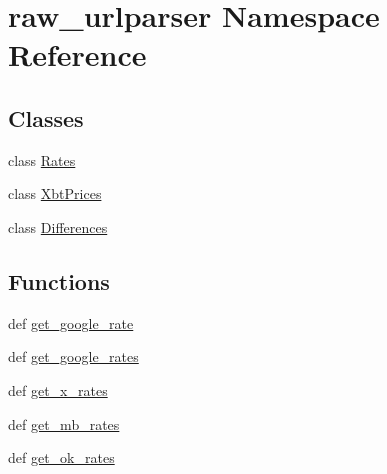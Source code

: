 \hypertarget{namespaceraw__urlparser}{\section{raw\-\_\-urlparser Namespace Reference}
\label{namespaceraw__urlparser}
}
\subsection*{Classes}
\begin{DoxyCompactItemize}
\item 
class \hyperlink{classraw__urlparser_1_1_rates}{Rates}
\item 
class \hyperlink{classraw__urlparser_1_1_xbt_prices}{Xbt\-Prices}
\item 
class \hyperlink{classraw__urlparser_1_1_differences}{Differences}
\end{DoxyCompactItemize}
\subsection*{Functions}
\begin{DoxyCompactItemize}
\item 
def \hyperlink{namespaceraw__urlparser_a27ce239a7915c6468e00168213575365}{get\-\_\-google\-\_\-rate}
\item 
def \hyperlink{namespaceraw__urlparser_a503f638b00ab579b8b829e1dbb95e547}{get\-\_\-google\-\_\-rates}
\item 
def \hyperlink{namespaceraw__urlparser_a264ca664879b007ee92399e30ec0d9bc}{get\-\_\-x\-\_\-rates}
\item 
def \hyperlink{namespaceraw__urlparser_a56532368ca9848b5f2ab298e3e6232bb}{get\-\_\-mb\-\_\-rates}
\item 
def \hyperlink{namespaceraw__urlparser_a3a9d9300bd89d803ca1fddb78145f58e}{get\-\_\-ok\-\_\-rates}
\end{DoxyCompactItemize}
